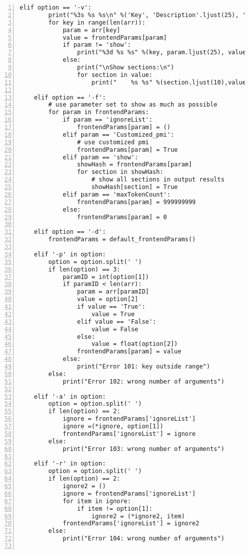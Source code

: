 \documentclass[10pt]{article}
\begin{document}
{\begin{lstlisting}[numbers=left,basicstyle=\ttfamily\footnotesize]
    elif option == '-v':
        print("%3s %s %s\n" %('Key', 'Description'.ljust(25), 'Value'))
        for key in range(len(arr)):
            param = arr[key]
            value = frontendParams[param]
            if param != 'show':
                print("%3d %s %s" %(key, param.ljust(25), value))
            else:
                print("\nShow sections:\n")
                for section in value:
                    print("    %s %s" %(section.ljust(10),value[section]))

    elif option == '-f':
        # use parameter set to show as much as possible
        for param in frontendParams:
            if param == 'ignoreList':
                frontendParams[param] = ()
            elif param == 'Customized_pmi':
                # use customized pmi
                frontendParams[param] = True
            elif param == 'show':
                showHash = frontendParams[param]
                for section in showHash:
                    # show all sections in output results
                    showHash[section] = True 
            elif param == 'maxTokenCount':
                frontendParams[param] = 999999999
            else:
                frontendParams[param] = 0

    elif option == '-d':
        frontendParams = default_frontendParams()

    elif '-p' in option:
        option = option.split(' ')
        if len(option) == 3:
            paramID = int(option[1])
            if paramID < len(arr):
                param = arr[paramID]
                value = option[2]
                if value == 'True':
                    value = True
                elif value == 'False':
                    value = False
                else:
                    value = float(option[2])
                frontendParams[param] = value
            else:
                print("Error 101: key outside range")
        else:
            print("Error 102: wrong number of arguments")

    elif '-a' in option:
        option = option.split(' ')
        if len(option) == 2:
            ignore = frontendParams['ignoreList']
            ignore =(*ignore, option[1])
            frontendParams['ignoreList'] = ignore
        else:
            print("Error 103: wrong number of arguments")

    elif '-r' in option:
        option = option.split(' ')
        if len(option) == 2:
            ignore2 = ()
            ignore = frontendParams['ignoreList']
            for item in ignore:
                if item != option[1]:
                    ignore2 = (*ignore2, item)
            frontendParams['ignoreList'] = ignore2
        else:
            print("Error 104: wrong number of arguments")


\end{lstlisting}}
\end{document}
